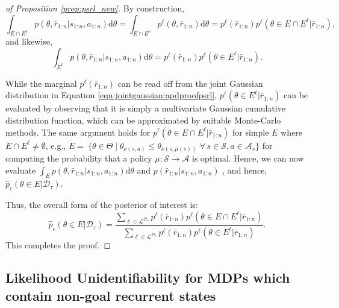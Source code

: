 \documentclass{amsart}
\begin{document}
\begin{proof}[of Proposition \ref{prop:psrl_new}]
By construction, $$\int_{E \cap E^\ell} p(\theta,\bar{r}_{1:n}|s_{1:n},a_{1:n}) \mathrm{d}\theta = \int_{E \cap E^\ell} p^\ell(\theta,\bar{r}_{1:n}) \mathrm{d} \theta = p^\ell(\bar{r}_{1:n}) p^\ell(\theta \in E \cap E^\ell|\bar{r}_{1:n}),$$
and likewise,
$$\int_{E^\ell} p(\theta,\bar{r}_{1:n}|s_{1:n},a_{1:n}) \mathrm{d}\theta = p^\ell(\bar{r}_{1:n}) p^\ell(\theta \in E^\ell|\bar{r}_{1:n}).$$

While the marginal $p^\ell(\bar{r}_{1:n})$ can be read off from the joint Gaussian distribution in Equation \ref{eqn:jointgaussian:apdproofpsrl},   $p^\ell(\theta \in E^\ell|\bar{r}_{1:n})$ can be evaluated by observing that it is simply a multivariate Gaussian cumulative distribution function, which can be approximated by suitable Monte-Carlo methods. The same argument holds for $p^\ell(\theta \in E  \cap E^\ell|\bar{r}_{1:n})$ for simple $E$ where $E \cap E^\ell \neq \emptyset$, e.g.,
$E=\ \{\theta \in \Theta \mid\theta_{\nu(s,a)} \leq\theta_{\nu(s,\mu(s))}  \,\, \forall \, s \in \mathcal{S}, a \in \mathcal{A}_s\}$ for computing the probability that a policy $\mu:\mathcal{S} \rightarrow \mathcal{A}$ is optimal. Hence, we can now evaluate $\int_{E} p(\theta,\bar{r}_{1:n}|s_{1:n},a_{1:n})\mathrm{d} \theta$ and $ p(\bar{r}_{1:n}|s_{1:n},a_{1:n})$ , and hence, $\hat{p}_\epsilon(\theta \in E|\mathcal{D}_\tau)$. 

Thus, the overall form of the posterior of interest is:
\begin{equation}
\hat{p}_\epsilon(\theta \in E|\mathcal{D}_\tau) = \frac{\sum_{\ell \in \mathcal{L}^{\mathcal{D}_\tau}} p^\ell(\bar{r}_{1:n}) p^\ell(\theta \in E \cap E^\ell|\bar{r}_{1:n})}{\sum_{\ell \in \mathcal{L}^{\mathcal{D}_\tau}} p^\ell(\bar{r}_{1:n}) p^\ell(\theta \in E^\ell|\bar{r}_{1:n})}.
\end{equation}
This completes the proof.
 \end{proof}

 
 \subsection{Likelihood Unidentifiability for MDPs which contain non-goal recurrent states}
\end{document}
